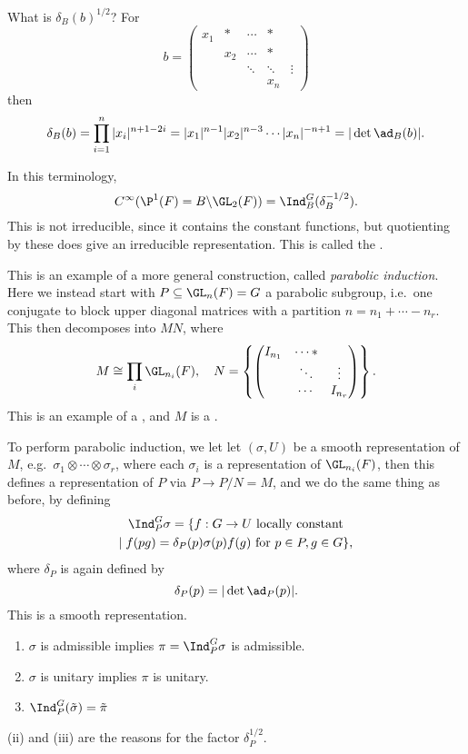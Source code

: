 \documentclass[a4paper]{article}
\begin{document}
What is $\delta_B(b)^{1/2}$? For
\[
  b =
  \begin{pmatrix}
    x_1 & * & \cdots & *\\
    & x_2 & \cdots & *\\
    & & \ddots & \ddots & \vdots\\
    & & & x_n
  \end{pmatrix}
\]
then
\[
  \delta_B(b) = \prod_{i = 1}^n |x_i|^{n + 1 - 2i} = |x_1|^{n - 1} |x_2|^{n - 3} \cdots |x_n|^{-n + 1} = |\det \ad_B(b)|.
\]
\begin{eg}
  In this terminology,
  \[
    C^\infty(\P^1(F) = B \backslash \GL_2(F)) = \Ind_B^G(\delta_B^{-1/2}).
  \]
  This is not irreducible, since it contains the constant functions, but quotienting by these does give an irreducible representation. This is called the .
\end{eg}
This is an example of a more general construction, called \emph{parabolic induction}. Here we instead start with $P \subseteq \GL_n(F) = G$ a parabolic subgroup, i.e.\ one conjugate to block upper diagonal matrices with a partition $n = n_1 + \cdots - n_r$. This then decomposes into $MN$, where
\[
  M \cong \prod_i \GL_{n_i}(F),\quad N = \left\{
    \begin{pmatrix}
      I_{n_1} & \cdots *\\
      & \ddots & \vdots\\
      & \cdots & I_{n_r}
    \end{pmatrix}
  \right\}.
\]
This is an example of a , and $M$ is a .

To perform parabolic induction, we let let $(\sigma, U)$ be a smooth representation of $M$, e.g.\ $\sigma_1 \otimes \cdots \otimes \sigma_r$, where each $\sigma_i$ is a representation of $\GL_{n_i}(F)$, then this defines a representation of $P$ via $P \to P/N = M$, and we do the same thing as before, by defining
\begin{multline*}
  \Ind_P^G \sigma = \{f: G \to U\text{ locally constant} \\
  \mid f(pg) = \delta_P(p) \sigma(p) f(g)\text{ for }p \in P, g \in G\},
\end{multline*}
where $\delta_P$ is again defined by
\[
  \delta_P(p) = |\det \ad_P(p)|.
\]
This is a smooth representation.

\begin{prop}\leavevmode
  \begin{enumerate}
    \item $\sigma$ is admissible implies $\pi = \Ind_P^G \sigma$ is admissible.
    \item $\sigma$ is unitary implies $\pi$ is unitary.
    \item $\Ind_P^G(\tilde{\sigma}) = \tilde{\pi}$
  \end{enumerate}
\end{prop}
(ii) and (iii) are the reasons for the factor $\delta_P^{1/2}$.
\end{document}
